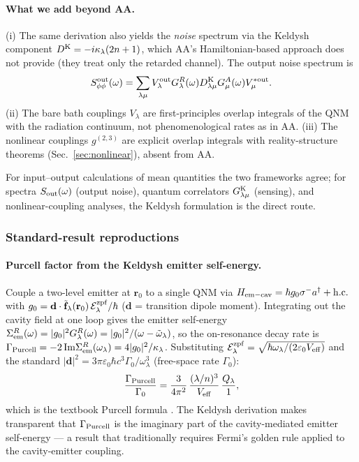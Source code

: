 \documentclass[12pt]{article}
\newcommand{\zpf}{{\rm zpf}}
\newcommand{\eff}{{\rm eff}}
\newcommand{\Keldysh}{{\rm K}}
\newcommand{\tf}{\tilde{\mathbf{f}}}
\newcommand{\tomega}{\tilde{\omega}}
\begin{document}
\paragraph{What we add beyond AA.}
(i) The same derivation also yields the \emph{noise} spectrum via the
Keldysh component $D^\Keldysh = -i\kappa_\lambda(2n+1)$, which AA's
Hamiltonian-based approach does not provide (they treat only the
retarded channel).  The output noise spectrum is
\begin{equation}
  S^{\rm out}_{\phi\phi}(\omega) = \sum_{\lambda\mu}V^{\rm out}_\lambda
    G^R_\lambda(\omega) D^\Keldysh_{\lambda\mu}
    G^A_\mu(\omega) V^{*\rm out}_\mu.
\end{equation}
(ii) The bare bath couplings $V_\lambda$ are first-principles overlap
integrals of the QNM with the radiation continuum, not phenomenological
rates as in AA.
(iii) The nonlinear couplings $g^{(2,3)}$ are explicit overlap
integrals with reality-structure theorems
(Sec.~\ref{sec:nonlinear}), absent from AA.

For input--output calculations of mean quantities the two frameworks
agree; for spectra $S_{\rm out}(\omega)$ (output noise), quantum
correlators $G^\Keldysh_{\lambda\mu}$ (sensing), and nonlinear-coupling
analyses, the Keldysh formulation is the direct route.

\subsubsection*{Standard-result reproductions}
\label{sec:standard_reproductions}

\paragraph{Purcell factor from the Keldysh emitter self-energy.}
Couple a two-level emitter at $\mathbf{r}_0$ to a single QNM via
$H_{\rm em-cav} = \hbar g_0 \sigma^- a^\dagger + \mathrm{h.c.}$ with
$g_0 = \mathbf{d}\cdot\tf_\lambda(\mathbf{r}_0)\,\mathcal{E}_\lambda^\zpf
/\hbar$ ($\mathbf{d}$ = transition dipole moment).  Integrating out the
cavity field at one loop gives the emitter self-energy
\(\Sigma^R_{\rm em}(\omega) = |g_0|^2 G^R_\lambda(\omega)
= |g_0|^2/(\omega-\tomega_\lambda)\), so the on-resonance decay rate is
$\Gamma_{\rm Purcell} = -2\,\mathrm{Im}\Sigma^R_{\rm em}(\omega_\lambda)
= 4|g_0|^2/\kappa_\lambda$.  Substituting
$\mathcal{E}_\lambda^\zpf = \sqrt{\hbar\omega_\lambda/(2\varepsilon_0
V_\eff)}$ and the standard $|\mathbf{d}|^2 = 3\pi\varepsilon_0\hbar c^3
\Gamma_0/\omega_\lambda^3$ (free-space rate $\Gamma_0$):
\begin{equation}
  \frac{\Gamma_{\rm Purcell}}{\Gamma_0} =
  \frac{3}{4\pi^2}\,\frac{(\lambda/n)^3}{V_\eff}\,\frac{Q_\lambda}{1},
  \label{eq:purcell_keldysh}
\end{equation}
which is the textbook Purcell formula \cite{Purcell1946,Lalanne2018}.
The Keldysh derivation makes transparent that $\Gamma_{\rm Purcell}$
is the imaginary part of the cavity-mediated emitter self-energy --- a
result that traditionally requires Fermi's golden rule applied to the
cavity-emitter coupling.
\end{document}
